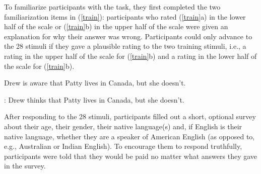 \documentclass[11pt,fleqn]{article}
\newcommand{\6}{\mbox{$[\hspace*{-.6mm}[$}}
\newcommand{\9}{\mbox{$]\hspace*{-.6mm}]$}}
\begin{document}
{To familiarize participants with the task, they first completed the two familiarization items in (\ref{train}): participants who rated (\ref{train}a) in the lower half of the scale or (\ref{train}b) in the upper half of the scale were given an explanation for why their answer was wrong. Participants could only advance to the 28 stimuli if they gave a plausible rating to the two training stimuli, i.e., a rating in the upper half of the scale for (\ref{train}b) and a rating in the lower half of the scale for (\ref{train}b).

\begin{exe}
\ex\label{train}
\begin{xlist}
 Drew is aware that Patty lives in Canada, but she doesn't.

: Drew thinks that Patty lives in Canada, but she doesn't.
\end{xlist}
\end{exe}

After responding to the 28 stimuli, participants filled out a short, optional survey about their age, their gender, their native language(s) and, if English is their native language, whether they are a speaker of American English (as opposed to, e.g., Australian or Indian English). To encourage them to respond truthfully, participants were told that they would be paid no matter what answers they gave in the survey.

}
\end{document}

